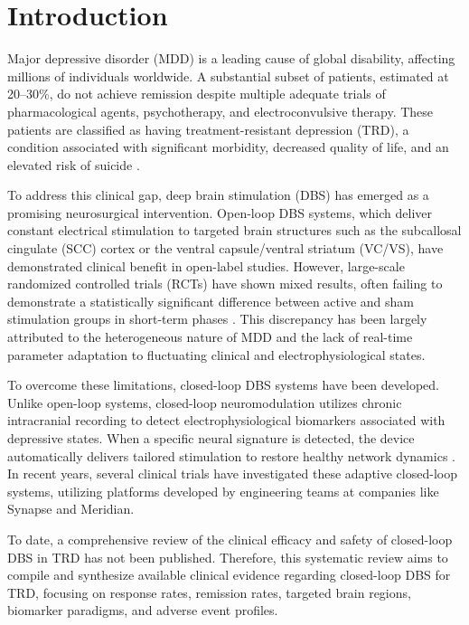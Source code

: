\section{Introduction}
Major depressive disorder (MDD) is a leading cause of global disability, affecting millions of individuals worldwide. A substantial subset of patients, estimated at 20--30\%, do not achieve remission despite multiple adequate trials of pharmacological agents, psychotherapy, and electroconvulsive therapy. These patients are classified as having treatment-resistant depression (TRD), a condition associated with significant morbidity, decreased quality of life, and an elevated risk of suicide \citep{Vance2023}.

To address this clinical gap, deep brain stimulation (DBS) has emerged as a promising neurosurgical intervention. Open-loop DBS systems, which deliver constant electrical stimulation to targeted brain structures such as the subcallosal cingulate (SCC) cortex or the ventral capsule/ventral striatum (VC/VS), have demonstrated clinical benefit in open-label studies. However, large-scale randomized controlled trials (RCTs) have shown mixed results, often failing to demonstrate a statistically significant difference between active and sham stimulation groups in short-term phases \citep{Thorne2024}. This discrepancy has been largely attributed to the heterogeneous nature of MDD and the lack of real-time parameter adaptation to fluctuating clinical and electrophysiological states.

To overcome these limitations, closed-loop DBS systems have been developed. Unlike open-loop systems, closed-loop neuromodulation utilizes chronic intracranial recording to detect electrophysiological biomarkers associated with depressive states. When a specific neural signature is detected, the device automatically delivers tailored stimulation to restore healthy network dynamics \citep{Patel2025}. In recent years, several clinical trials have investigated these adaptive closed-loop systems, utilizing platforms developed by engineering teams at companies like Synapse and Meridian.

To date, a comprehensive review of the clinical efficacy and safety of closed-loop DBS in TRD has not been published. Therefore, this systematic review aims to compile and synthesize available clinical evidence regarding closed-loop DBS for TRD, focusing on response rates, remission rates, targeted brain regions, biomarker paradigms, and adverse event profiles.
